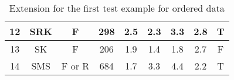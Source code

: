 \documentclass[12pt]{report}
\begin{document}
\begin{solution}
\begin{enumerate}
\begin{itemize}
\begin{table}[H]
\begin{tabular}{|c|c|c|c|c|c|c|c|c|}
                12 & \cellcolor[HTML]{FE0000}SRK & F      & 298                         & 2.5 & 2.3                         & 3.3 & 2.8 & T         \\ \hline
                13 & SK                          & F      & \cellcolor[HTML]{FE0000}206 & 1.9 & 1.4                         & 1.8 & 2.7 & F         \\ \hline
                14 & \cellcolor[HTML]{FE0000}SMS & F or R & 684                         & 1.7 & 3.3                         & 4.4 & 2.2 & T         \\ \hline
                \end{tabular}
                \caption{Extension for the first test example for ordered data}
                \label{table:ext1_1}
                \end{table}
            \end{itemize}

\end{enumerate}
\end{solution}
\end{document}
